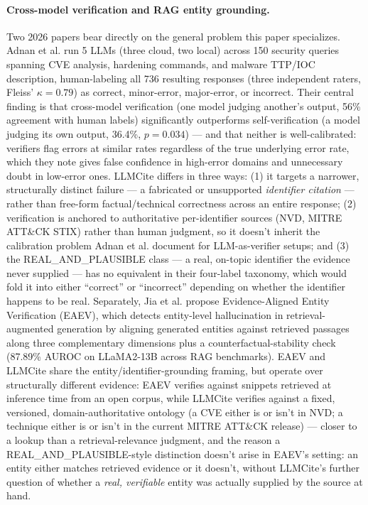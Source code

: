 \documentclass[pdflatex,sn-mathphys-num]{sn-jnl}%
\begin{document}
\paragraph{Cross-model verification and RAG entity grounding.} Two 2026
papers bear directly on the general problem this paper specializes.
Adnan et al. \cite{ieee_2026_cross_self_verif_cyber} run 5 LLMs (three
cloud, two local) across 150 security queries spanning CVE analysis,
hardening commands, and malware TTP/IOC description, human-labeling all
736 resulting responses (three independent raters, Fleiss' $\kappa=0.79$)
as correct, minor-error, major-error, or incorrect. Their central
finding is that cross-model verification (one model judging another's
output, 56\% agreement with human labels) significantly outperforms
self-verification (a model judging its own output, 36.4\%, $p=0.034$)
--- and that neither is well-calibrated: verifiers flag errors at
similar rates regardless of the true underlying error rate, which they
note gives false confidence in high-error domains and unnecessary doubt
in low-error ones. LLMCite differs in three ways: (1) it targets a
narrower, structurally distinct failure --- a fabricated or unsupported
\textit{identifier citation} --- rather than free-form factual/technical
correctness across an entire response; (2) verification is anchored to
authoritative per-identifier sources (NVD, MITRE ATT\&CK STIX) rather
than human judgment, so it doesn't inherit the calibration problem Adnan
et al. document for LLM-as-verifier setups; and (3) the
REAL\_AND\_PLAUSIBLE class --- a real, on-topic identifier the evidence
never supplied --- has no equivalent in their four-label taxonomy, which
would fold it into either ``correct'' or ``incorrect'' depending on
whether the identifier happens to be real. Separately, Jia et al.
\cite{acl_findings_2026_entity_verif_rag} propose Evidence-Aligned
Entity Verification (EAEV), which detects entity-level hallucination in
retrieval-augmented generation by aligning generated entities against
retrieved passages along three complementary dimensions plus a
counterfactual-stability check (87.89\% AUROC on LLaMA2-13B across RAG
benchmarks). EAEV and LLMCite share the entity/identifier-grounding
framing, but operate over structurally different evidence: EAEV verifies
against snippets retrieved at inference time from an open corpus, while
LLMCite verifies against a fixed, versioned, domain-authoritative
ontology (a CVE either is or isn't in NVD; a technique either is or
isn't in the current MITRE ATT\&CK release) --- closer to a lookup than
a retrieval-relevance judgment, and the reason a
REAL\_AND\_PLAUSIBLE-style distinction doesn't arise in EAEV's setting:
an entity either matches retrieved evidence or it doesn't, without
LLMCite's further question of whether a \textit{real, verifiable} entity
was actually supplied by the source at hand.
\end{document}
